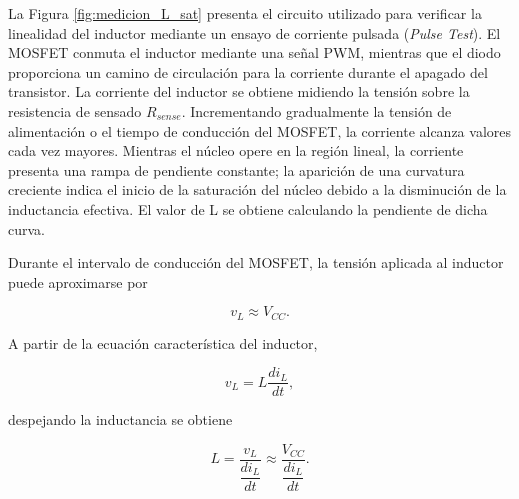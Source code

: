 \documentclass[]{article}
\begin{document}
	
	La Figura \ref{fig:medicion_L_sat} presenta el circuito utilizado para verificar la linealidad del inductor mediante un ensayo de corriente pulsada (\textit{Pulse Test}). El MOSFET conmuta el inductor mediante una señal PWM, mientras que el diodo proporciona un camino de circulación para la corriente durante el apagado del transistor. La corriente del inductor se obtiene midiendo la tensión sobre la resistencia de sensado $R_{sense}$. Incrementando gradualmente la tensión de alimentación o el tiempo de conducción del MOSFET, la corriente alcanza valores cada vez mayores. Mientras el núcleo opere en la región lineal, la corriente presenta una rampa de pendiente constante; la aparición de una curvatura creciente indica el inicio de la saturación del núcleo debido a la disminución de la inductancia efectiva. El valor de L se obtiene calculando la pendiente de dicha curva.
	
	Durante el intervalo de conducción del MOSFET, la tensión aplicada al
	inductor puede aproximarse por
	
	\begin{equation}
		v_L \approx V_{CC}.
	\end{equation}
	
	A partir de la ecuación característica del inductor,
	
	\begin{equation}
		v_L=L\frac{di_L}{dt},
	\end{equation}
	
	despejando la inductancia se obtiene
	
	\begin{equation}
		L=\frac{v_L}{\dfrac{di_L}{dt}}
		\approx
		\frac{V_{CC}}{\dfrac{di_L}{dt}}.
	\end{equation}
	
\end{document}
